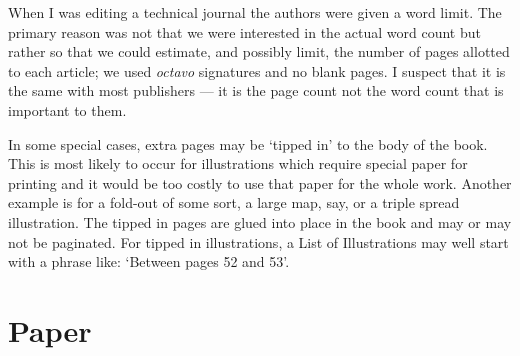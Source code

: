 \documentclass[10pt,a4paper,oneside,extrafontsizes]{memoir}%
\begin{document}
\begin{paracol}{2}
    When I was editing a technical journal the authors were given a word 
limit. The primary reason was not that we were interested in the actual
word count but rather so that we could estimate, and possibly limit, 
the number of pages allotted
to each article; we used \emph{octavo} 
signatures and no blank pages. 
I suspect that it is
the same with most publishers --- it is the page count not the word count
that is important to them.

    In some special cases, extra pages may be `tipped in' to
the body of the book. This is most likely to occur for 
illustrations which
require special paper for printing and it would be too costly to use
that paper for the whole work. Another example is for a fold-out of some sort,
a large map, say, or a triple spread illustration. The tipped in pages
are glued into place in the book and may or may not be paginated. For
tipped in illustrations, a List of Illustrations may well start with
a phrase like: `Between pages 52 and 53'.
\end{paracol}


\section{Paper}

\end{document}
